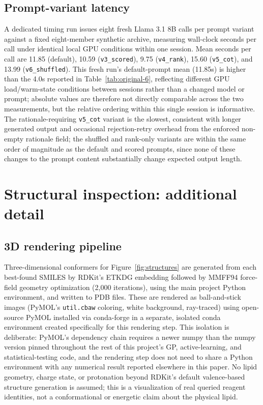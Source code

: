 \subsection{Prompt-variant latency}
\label{app:variant-latency}
A dedicated timing run issues eight fresh Llama 3.1 8B calls per prompt variant against a fixed eight-member synthetic archive, measuring wall-clock seconds per call under identical local GPU conditions within one session. Mean seconds per call are 11.85 (default), 10.59 (\texttt{v3\_scored}), 9.75 (\texttt{v4\_rank}), 15.60 (\texttt{v5\_cot}), and 13.99 (\texttt{v6\_shuffled}). This fresh run's default-prompt mean (11.85s) is higher than the 4.0s reported in Table~\ref{tab:original-6}, reflecting different GPU load/warm-state conditions between sessions rather than a changed model or prompt; absolute values are therefore not directly comparable across the two measurements, but the relative ordering within this single session is informative. The rationale-requiring \texttt{v5\_cot} variant is the slowest, consistent with longer generated output and occasional rejection-retry overhead from the enforced non-empty rationale field; the shuffled and rank-only variants are within the same order of magnitude as the default and scored prompts, since none of these changes to the prompt content substantially change expected output length.

\section{Structural inspection: additional detail}
\label{app:structures}
\subsection{3D rendering pipeline}
Three-dimensional conformers for Figure~\ref{fig:structures} are generated from each best-found SMILES by RDKit's ETKDG embedding followed by MMFF94 force-field geometry optimization (2,000 iterations), using the main project Python environment, and written to PDB files. These are rendered as ball-and-stick images (PyMOL's \texttt{util.cbaw} coloring, white background, ray-traced) using open-source PyMOL installed via conda-forge in a separate, isolated conda environment created specifically for this rendering step. This isolation is deliberate: PyMOL's dependency chain requires a newer numpy than the numpy version pinned throughout the rest of this project's GP, active-learning, and statistical-testing code, and the rendering step does not need to share a Python environment with any numerical result reported elsewhere in this paper. No lipid geometry, charge state, or protonation beyond RDKit's default valence-based structure generation is assumed; this is a visualization of real queried reagent identities, not a conformational or energetic claim about the physical lipid.

